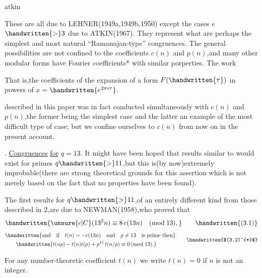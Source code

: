 \noindent\hfill atkin 

\noindent These are all due to LEHNER(1949a,1949b,1950) except the cases \uline{$e$}$\handwritten{>}3$ due to ATKIN(1967). They represent what are perhaps the simplest and most natural ``Ramanujan-type'' congruences. The general possibilities are not confined to the coefficients \uline{$c(n)$} and \uline{$p(n)$},and many other modular forms have Fourier coefficients* with similar porperties. The work

\noindent\handwritten{\rule{\linewidth}{0.4pt}}

\noindent *That is,the coefficients of the expansion of a form $F(\handwritten{\tau})$ in powers of $x=\handwritten{e^{2\pi i\tau}}$.

\noindent\handwritten{\rule{\linewidth}{0.4pt}}

\noindent described in this paper was in fact conducted simultaneously with \uline{$c(n)$} and \uline{$p(n)$},the former being the simplest case and the latter an example of the most difficult type of case; but we confine ourselves to \uline{$c(n)$} from now on in the present account.

. \uline{Congruences} \uline{for} $q=13$. It might have been hoped that results similar to  would exist for primes $q\handwritten{>}11$,but this is(by now)extremely improbable(there are strong theoretical grounds for this assertion which is not merely based on the fact that no properties have been found).

\noindent The first results for $q\handwritten{>}11$,of an entirely different kind from those described in \handwritten{\S}2,are due to NEWMAN(1958),who proved that
\[
\handwritten{\unsure{c|C}(13^{2}n)\equiv8\,c(13n)\quad(\mathrm{mod}\;13),}
\tag*{\handwritten{(3.1)}}
\]
\[
\begin{aligned}
&\handwritten{\text{and}\quad\text{if}\quad t(n)=-c(13n)\quad\text{and}\quad p\ne13\quad\text{is prime then}}\\
&\qquad\handwritten{t(np)-t(n)t(p)+p^{11}\,t(n/p)\equiv0\,(\mathrm{mod}\;13).}
\end{aligned}
\tag*{\handwritten{$(3.2)^{*}$}}
\]

\noindent\handwritten{\rule{\linewidth}{0.4pt}}

\noindent *For any number-theoretic coefficient \uline{$t(n)$} we write $t(n)=0$ if \uline{$n$} is not an integer.

